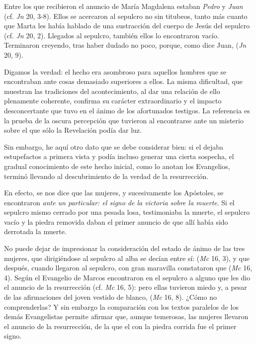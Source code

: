 \begin{body}
Entre los que recibieron el anuncio de María Magdalena estaban \textit{Pedro} y \textit{Juan} (cf. \textit{Jn} 20, 3-8). Ellos se acercaron al sepulcro no sin titubeos, tanto más cuanto que Marta les había hablado de una sustracción del cuerpo de Jesús del sepulcro (cf. \textit{Jn} 20, 2). Llegados al sepulcro, también ellos lo encontraron vacío. Terminaron creyendo, tras haber dudado no poco, porque, como dice Juan,  (\textit{Jn} 20, 9).

Digamos la verdad: el hecho era asombroso para aquellos hombres que se encontraban ante cosas demasiado superiores a ellos. La misma dificultad, que muestran las tradiciones del acontecimiento, al dar una relación de ello plenamente coherente, confirma su carácter extraordinario y el impacto desconcertante que tuvo en el ánimo de los afortunados testigos. La referencia\textit{ } es la prueba de la oscura percepción que tuvieron al encontrarse ante un misterio sobre el que sólo la Revelación podía dar luz.

Sin embargo, he aquí otro dato que se debe considerar bien: si el  dejaba estupefactos a primera vista y podía incluso generar una cierta sospecha, el gradual conocimiento de este hecho inicial, como lo anotan los Evangelios, terminó llevando al descubrimiento de la verdad de la resurrección.

En efecto, se nos dice que las mujeres, y sucesivamente los Apóstoles, se encontraron \textit{ante un  particular: el signo de la victoria sobre la muerte}. Si el sepulcro mismo cerrado por una pesada losa, testimoniaba la muerte, el sepulcro vacío y la piedra removida daban el primer anuncio de que allí había sido derrotada la muerte.

No puede dejar de impresionar la consideración del estado de ánimo de las tres mujeres, que dirigiéndose al sepulcro al alba se decían entre sí:  (\textit{Mc} 16, 3), y que después, cuando llegaron al sepulcro, con gran maravilla constataron que  (\textit{Mc} 16, 4). Según el Evangelio de Marcos encontraron en el sepulcro a alguno que les dio el anuncio de la resurrección (cf. \textit{Mc} 16, 5): pero ellas tuvieron miedo y, a pesar de las afirmaciones del joven vestido de blanco,  (\textit{Mc} 16, 8). ¿Cómo no comprenderlas? Y sin embargo la comparación con los textos paralelos de los demás Evangelistas permite afirmar que, aunque temerosas, las mujeres llevaron el anuncio de la resurrección, de la que el  con la piedra corrida fue el primer signo.


\end{body}

